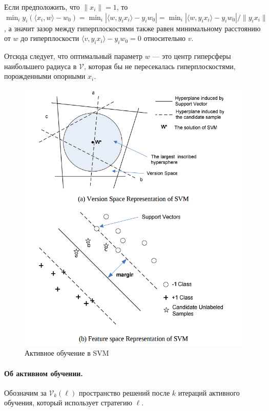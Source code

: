 \documentclass[specialist, 12pt, href]{article}
\begin{document}
Если предположить, что \(\|x_i\| = 1\), то
\(\min_i y_i(\langle x_i, w \rangle - w_0) = \min_i |\langle w, y_i x_i\rangle - y_i w_0| = \min_i |\langle w, y_i x_i\rangle - y_i w_0|/\|y_ix_i\|\),
а значит зазор между гиперплоскостями также равен минимальному
расстоянию от \(w\) до гиперплоскости
\(\langle v, y_i x_i\rangle - y_i w_0 = 0\) относительно \(v\).

Отсюда следует, что оптимальный параметр \(w\) --- это центр гиперсферы
наибольшего радиуса в \(\mathcal{V}\), которая бы не пересекалась гиперплоскостями, порожденными опорными \(x_i\).

\begin{figure}[htbp]
\centering
\includegraphics[width=5in]{img/svm+al.png}
\caption{Активное обучение в SVM}
\end{figure}

\paragraph{Об активном
обучении.}

Обозначим за \(\mathcal{V}_k(\ell)\) пространство решений после \(k\) итераций активного обучения,
который использует стратегию \(\ell\).
\end{document}
